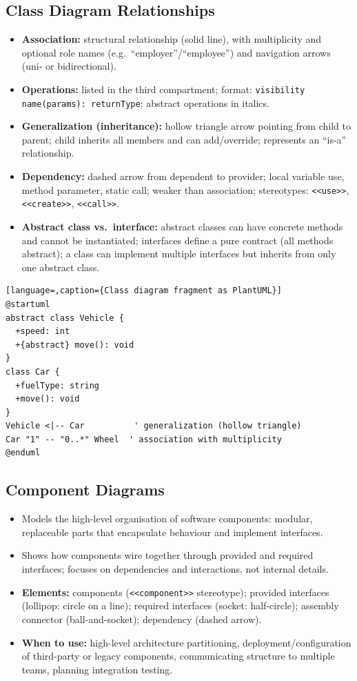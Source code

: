 \documentclass[hidelinks]{article}
\begin{document}
\subsection{Class Diagram Relationships}
\begin{itemize}
  \item \textbf{Association:} structural relationship (solid line), with multiplicity and optional role
        names (e.g.\ ``employer''/``employee'') and navigation arrows (uni- or bidirectional).
  \item \textbf{Operations:} listed in the third compartment; format:
        \texttt{visibility name(params): returnType}; abstract operations in italics.
  \item \textbf{Generalization (inheritance):} hollow triangle arrow pointing from child to parent;
        child inherits all members and can add/override; represents an ``is-a'' relationship.
  \item \textbf{Dependency:} dashed arrow from dependent to provider; local variable use, method
        parameter, static call; weaker than association; stereotypes: \texttt{<{}<use>{}>},
        \texttt{<{}<create>{}>}, \texttt{<{}<call>{}>}.
  \item \textbf{Abstract class vs.\ interface:} abstract classes can have concrete methods and
        cannot be instantiated; interfaces define a pure contract (all methods abstract); a class can
        implement multiple interfaces but inherits from only one abstract class.
\end{itemize}

\begin{lstlisting}[language=,caption={Class diagram fragment as PlantUML}]
@startuml
abstract class Vehicle {
  +speed: int
  +{abstract} move(): void
}
class Car {
  +fuelType: string
  +move(): void
}
Vehicle <|-- Car          ' generalization (hollow triangle)
Car "1" -- "0..*" Wheel  ' association with multiplicity
@enduml
\end{lstlisting}

\subsection{Component Diagrams}
\begin{itemize}
  \item Models the high-level organisation of software components: modular, replaceable parts that
        encapsulate behaviour and implement interfaces.
  \item Shows how components wire together through provided and required interfaces; focuses on
        dependencies and interactions, not internal details.
  \item \textbf{Elements:} components (\texttt{<{}<component>{}>} stereotype); provided interfaces
        (lollipop: circle on a line); required interfaces (socket: half-circle); assembly connector
        (ball-and-socket); dependency (dashed arrow).
  \item \textbf{When to use:} high-level architecture partitioning, deployment/configuration of
        third-party or legacy components, communicating structure to multiple teams, planning
        integration testing.
\end{itemize}
\end{document}
